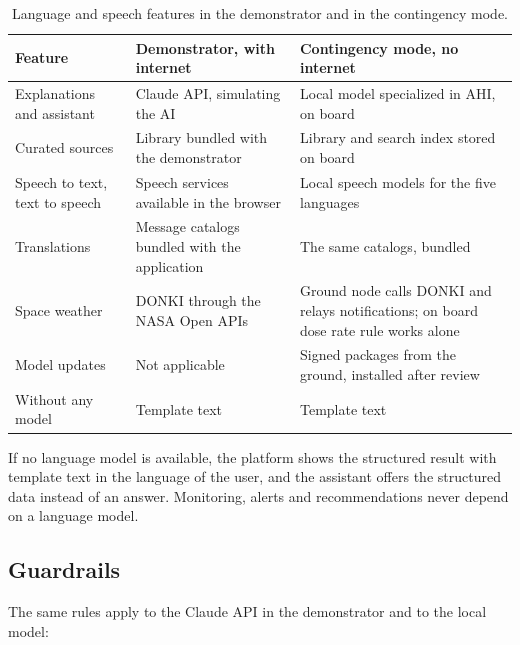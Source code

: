\begin{table}[htbp]
\centering
\vspace{0.8em}
\caption{Language and speech features in the demonstrator and in the contingency mode.}
\label{tab:offline-architecture}
\footnotesize
\begin{tabular}{p{3.0cm}p{5.0cm}p{6.0cm}}
\hline
\textbf{Feature} & \textbf{Demonstrator, with internet} & \textbf{Contingency mode, no internet} \\
\hline
Explanations and assistant & Claude API, simulating the AI & Local model specialized in AHI, on board \\
Curated sources & Library bundled with the demonstrator & Library and search index stored on board \\
Speech to text, text to speech & Speech services available in the browser & Local speech models for the five languages \\
Translations & Message catalogs bundled with the application & The same catalogs, bundled \\
Space weather & DONKI through the NASA Open APIs & Ground node calls DONKI and relays notifications; on board dose rate rule works alone \\
Model updates & Not applicable & Signed packages from the ground, installed after review \\
Without any model & Template text & Template text \\
\hline
\end{tabular}
\vspace{1.2em}
\end{table}

If no language model is available, the platform shows the structured result with template text in the language of the user, and the assistant offers the structured data instead of an answer. Monitoring, alerts and recommendations never depend on a language model.

\subsection{Guardrails}
\label{subsec:guardrails}

The same rules apply to the Claude API in the demonstrator and to the local model:

